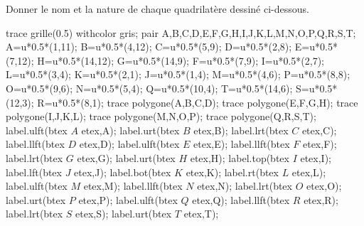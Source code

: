 \begin{exercice*} %
   Donner le nom et la nature de chaque quadrilatère dessiné ci-dessous.
   \begin{center}
      \begin{Geometrie}[CoinHD={(7.5u,6.5u)}]
         trace grille(0.5) withcolor gris;
         pair A,B,C,D,E,F,G,H,I,J,K,L,M,N,O,P,Q,R,S,T;
         A=u*0.5*(1,11);
         B=u*0.5*(4,12);
         C=u*0.5*(5,9);
         D=u*0.5*(2,8);
         E=u*0.5*(7,12);
         H=u*0.5*(14,12);
         G=u*0.5*(14,9);
         F=u*0.5*(7,9);
         I=u*0.5*(2,7);
         L=u*0.5*(3,4);
         K=u*0.5*(2,1);
         J=u*0.5*(1,4);
         M=u*0.5*(4,6);
         P=u*0.5*(8,8);
         O=u*0.5*(9,6);
         N=u*0.5*(5,4);
         Q=u*0.5*(10,4);
         T=u*0.5*(14,6);
         S=u*0.5*(12,3);
         R=u*0.5*(8,1);
         trace polygone(A,B,C,D);
         trace polygone(E,F,G,H);
         trace polygone(I,J,K,L);
         trace polygone(M,N,O,P);
         trace polygone(Q,R,S,T);
         label.ulft(btex $A$ etex,A);
         label.urt(btex $B$ etex,B);
         label.lrt(btex $C$ etex,C);
         label.llft(btex $D$ etex,D);
         label.ulft(btex $E$ etex,E);
         label.llft(btex $F$ etex,F);
         label.lrt(btex $G$ etex,G);
         label.urt(btex $H$ etex,H);
         label.top(btex $I$ etex,I);
         label.lft(btex $J$ etex,J);
         label.bot(btex $K$ etex,K);
         label.rt(btex $L$ etex,L);
         label.ulft(btex $M$ etex,M);
         label.llft(btex $N$ etex,N);
         label.lrt(btex $O$ etex,O);
         label.urt(btex $P$ etex,P);
         label.ulft(btex $Q$ etex,Q);
         label.llft(btex $R$ etex,R);
         label.lrt(btex $S$ etex,S);
         label.urt(btex $T$ etex,T);
      \end{Geometrie}
   \end{center} 
\end{exercice*}
